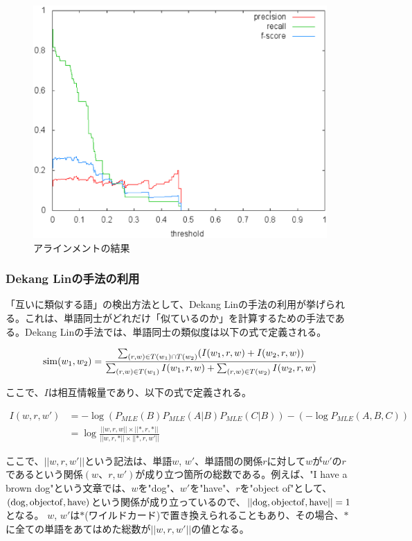\documentclass[12pt]{jarticle}
\begin{document}
\begin{figure}[htbp]
  \begin{center}
    \includegraphics[scale=0.5]{image/score.eps}
  \end{center}
  \caption{アラインメントの結果}
  \label{word_net}
\end{figure}

\subsubsection{Dekang Linの手法の利用}
「互いに類似する語」の検出方法として、Dekang Linの手法\cite{DekangLin}の利用が挙げられる。これは、単語同士がどれだけ「似ているのか」を計算するための手法である。Dekang Linの手法では、単語同士の類似度は以下の式で定義される。

\begin{equation}
  {\rm sim}(w_1, w_2) = \frac{\sum_{(r,w)\in T(w_1)\cap T(w_2)} (I(w_1, r, w) + I(w_2, r, w))}{\sum_{(r,w) \in T(w_1)}I(w_1, r, w) + \sum_{(r,w) \in T(w_2)}I(w_2, r, w)}
\end{equation}

ここで、$I$は相互情報量であり、以下の式で定義される。

\begin{align}
I(w, r, w') & = -\log(P_{MLE}(B)P_{MLE}(A|B)P_{MLE}(C|B))-(-\log P_{MLE}(A,B,C)) \\
 & = \log \frac{||w,r,w||\times||*,r,*||}{||w,r,*||\times||*,r,w'||}
\end{align}

ここで、$||w, r, w'||$という記法は、単語$w$, $w'$、単語間の関係$r$に対して$w$が$w'$の$r$であるという関係$(w、r, w')$が成り立つ箇所の総数である。例えば、"I have a brown dog"という文章では、$w$を"dog"、$w'$を"have"、$r$を"object of"として、$\rm (dog, objectof, have)$という関係が成り立っているので、$\rm||dog, object of, have||=1$となる。
$w$, $w'$は$*$(ワイルドカード)で置き換えられることもあり、その場合、$*$に全ての単語をあてはめた総数が$||w, r, w'||$の値となる。
\end{document}
